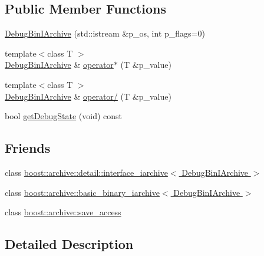 \subsection*{Public Member Functions}
\begin{DoxyCompactItemize}
\item 
\hyperlink{classxtd_1_1serializer_1_1DebugBinIArchive_a4ea7040c4449afdc0a3559e2b7bc6625}{Debug\+Bin\+I\+Archive} (std\+::istream \&p\+\_\+os, int p\+\_\+flags=0)
\item 
{\footnotesize template$<$class T $>$ }\\\hyperlink{classxtd_1_1serializer_1_1DebugBinIArchive}{Debug\+Bin\+I\+Archive} \& \hyperlink{classxtd_1_1serializer_1_1DebugBinIArchive_a14ea4c855993c582b1bfd9a2c6528384}{operator$\ast$} (T \&p\+\_\+value)
\item 
{\footnotesize template$<$class T $>$ }\\\hyperlink{classxtd_1_1serializer_1_1DebugBinIArchive}{Debug\+Bin\+I\+Archive} \& \hyperlink{classxtd_1_1serializer_1_1DebugBinIArchive_a16c6f8a7cfaf497756c3edbfa16b9c0c}{operator/} (T \&p\+\_\+value)
\item 
bool \hyperlink{classxtd_1_1serializer_1_1DebugBinIArchive_a94745bb397fc67967d2ec07dc84d8c7e}{get\+Debug\+State} (void) const 
\end{DoxyCompactItemize}
\subsection*{Friends}
\begin{DoxyCompactItemize}
\item 
class \hyperlink{classxtd_1_1serializer_1_1DebugBinIArchive_aace6c76e9b138089c32705b6ec13b0e5}{boost\+::archive\+::detail\+::interface\+\_\+iarchive$<$ Debug\+Bin\+I\+Archive $>$}
\item 
class \hyperlink{classxtd_1_1serializer_1_1DebugBinIArchive_abc4efd1d58236e3dbfef39240b5457d4}{boost\+::archive\+::basic\+\_\+binary\+\_\+iarchive$<$ Debug\+Bin\+I\+Archive $>$}
\item 
class \hyperlink{classxtd_1_1serializer_1_1DebugBinIArchive_aaca003bb8a4fc59424e4025130da4edd}{boost\+::archive\+::save\+\_\+access}
\end{DoxyCompactItemize}


\subsection{Detailed Description}


